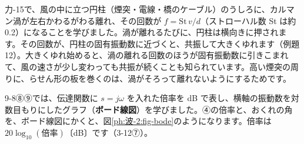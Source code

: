 力-15で、風の中に立つ円柱（煙突・電線・橋のケーブル）のうしろに、カルマン渦が左右かわるがわる離れ、その回数が $f=\mathrm{St}\,v/d$（ストローハル数 St は約0.2）になることを学びました。渦が離れるたびに、円柱は横向きに押されます。その回数が、円柱の固有振動数に近づくと、共振して大きくゆれます（例題12）。大きくゆれ始めると、渦の離れる回数のほうが固有振動数に引きこまれて、風の速さが少し変わっても共振が続くことも知られています。高い煙突の周りに、らせん形の板を巻くのは、渦がそろって離れないようにするためです。

\label{ph:波-2:sec10}
9-8⑧⑨では、伝達関数に $s=j\omega$ を入れた倍率を dB で表し、横軸の振動数を対数目もりにしたグラフ（\textbf{ボード線図}）を学びました。④の倍率と、おくれの角を、ボード線図にかくと、図\ref{ph:波-2:fig-bode}のようになります。倍率は $20\log_{10}(\text{倍率})$〔dB〕です（3-12⑦）。

